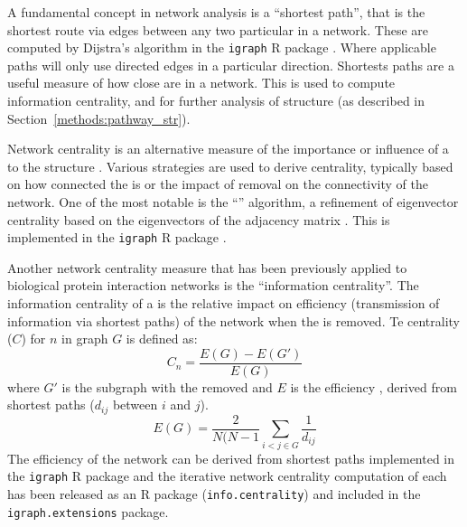 A fundamental concept in network analysis is a ``\gls{shortest path}'', that is the shortest route via \glspl{edge} between any two particular  in a network. These are computed by Dijstra's algorithm \citep{Dijkstra1959} in the \texttt{igraph} R package \citep{igraph}. Where applicable paths will only use directed \glspl{edge} in a particular direction. Shortests paths are a useful measure of how close  are in a network. This is used to compute \gls{information centrality}, and for further analysis of  structure (as described in Section~\ref{methods:pathway_str}).

Network \gls{centrality} is an alternative measure of the importance or influence of a  to the  structure \citep{Borgatti2005}. Various strategies are used to derive centrality,  typically based on how connected the  is or the impact of  removal on the connectivity of the network. One of the most notable is the ``'' algorithm, a refinement of eigenvector \gls{centrality} based on the eigenvectors of the adjacency matrix \citep{Brin1998}. This is implemented in the \texttt{igraph} R package \citep{igraph}.

Another network \gls{centrality} measure that has been previously applied to biological protein interaction networks \citep{Kranthi2013} is the ``\gls{information centrality}''. The \gls{information centrality} of a  is the relative impact on efficiency (transmission of information via \glspl{shortest path}) of the network when the  is removed. Te \gls{centrality} ($C$) \citep{Kranthi2013} for  $n$ in graph $G$ is defined as: $$C_n = \frac{E(G)-E(G')}{E(G)}$$ where $G'$ is the subgraph with the  removed and $E$ is the efficiency \citep{Latora2001}, derived from \glspl{shortest path} ($d_{ij}$ between  $i$ and $j$). $$E(G) = \frac{2}{N(N-1} \sum_{i<j \in G}^{} \frac{1}{d_{ij}}$$ The efficiency of the network can be derived from \glspl{shortest path} implemented in the \texttt{igraph} R package and the iterative network \gls{centrality} computation of each  has been released as an R package (\texttt{info.centrality}) and included in the \texttt{igraph.extensions} package.

